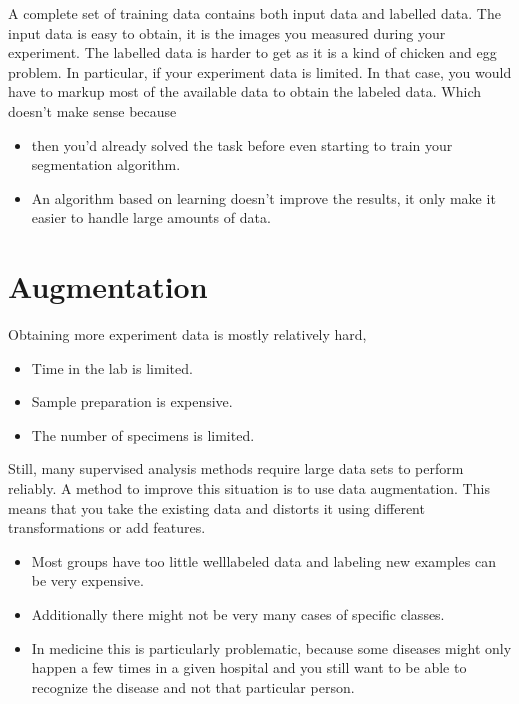 \documentclass[letterpaper,10pt,english]{sphinxmanual}
\begin{document}
\sphinxAtStartPar
A complete set of training data contains both input data and labelled data. The input data is easy to obtain, it is the images you measured during your experiment. The labelled data is harder to get as it is a kind of chicken and egg problem. In particular, if your experiment data is limited. In that case, you would have to mark\sphinxhyphen{}up most of the available data to obtain the labeled data. Which doesn’t make sense because
\begin{itemize}
\item {} 
\sphinxAtStartPar
then you’d already solved the task before even starting to train your segmentation algorithm.

\item {} 
\sphinxAtStartPar
An algorithm based on learning doesn’t improve the results, it only make it easier to handle large amounts of data.

\end{itemize}


\chapter{Augmentation}
\label{\detokenize{03-Datasets:augmentation}}
\sphinxAtStartPar
Obtaining more experiment data is mostly relatively hard,
\begin{itemize}
\item {} 
\sphinxAtStartPar
Time in the lab is limited.

\item {} 
\sphinxAtStartPar
Sample preparation is expensive.

\item {} 
\sphinxAtStartPar
The number of specimens is limited.

\end{itemize}

\sphinxAtStartPar
Still, many supervised analysis methods require large data sets to perform reliably. A method to improve this situation is to use data augmentation. This means that you take the existing data and distorts it using different transformations or add features.
\begin{itemize}
\item {} 
\sphinxAtStartPar
Most groups have too little well\sphinxhyphen{}labeled data and labeling new examples can be very expensive.

\item {} 
\sphinxAtStartPar
Additionally there might not be very many cases of specific classes.

\item {} 
\sphinxAtStartPar
In medicine this is particularly problematic, because some diseases might only happen a few times in a given hospital and you still want to be able to recognize the disease and not that particular person.

\end{itemize}
\end{document}
